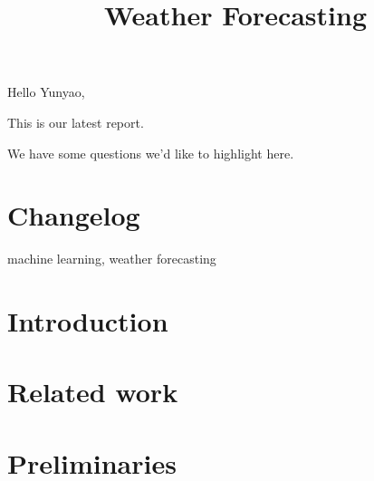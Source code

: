 



Hello Yunyao,

This is our latest report.

We have some questions we'd like to highlight here.

\begin{itemize}

\end{itemize}

\section{Changelog}
\begin{itemize}

\end{itemize}




\newpage

\title{Weather Forecasting}
\author{
    \and
    \and
    \and
}


\maketitle

\begin{abstract}

\end{abstract}

\begin{IEEEkeywords}
machine learning, weather forecasting
\end{IEEEkeywords}

\section{Introduction}


\section{Related work}\label{sec:relatedwork}




\section{Preliminaries}


